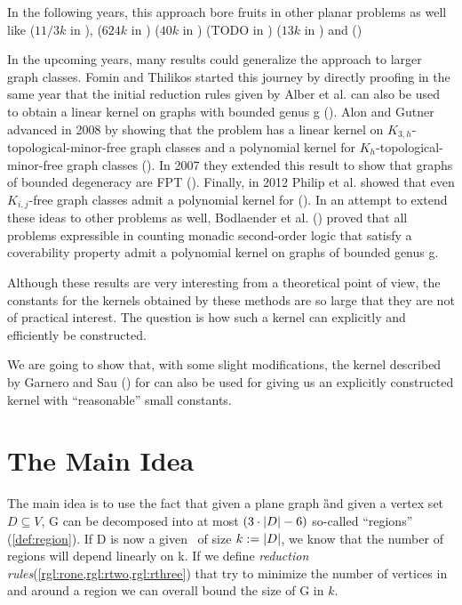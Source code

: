 In the following years, this approach bore fruits in other planar problems as well like 
\xspace ($11/3k$ in \cite{Kowalik2013}),
\xspace ($624k$ in \cite{Wang2011})
\xspace ($40k$ in \cite{Kanj2011})
\xspace (TODO in \cite{Guo2006})
\xspace ($13k$ in \cite{Bonamy2016}) and 
\xspace (\cite{Garnero2019})

In the upcoming years, many results could generalize the approach to larger graph classes. Fomin and Thilikos started this journey by directly proofing in the same year that the initial reduction rules given by Alber et al. \cite{Alber2004} can also be used to obtain a linear kernel on graphs with bounded genus g (\cite{Fomin2004}).  Alon and Gutner advanced in 2008 by showing that the problem has a linear kernel on $K_{3,h}$-topological-minor-free graph classes and a polynomial kernel for $K_h$-topological-minor-free graph classes (\cite{Gutner2009}). In 2007 they extended this result to show that graphs of bounded degeneracy are FPT (\cite{Alon2007}). Finally, in 2012 Philip et al. showed that even $K_{i,j}$-free graph classes admit a polynomial kernel for \dom (\cite{Philip2012}). 
In an attempt to extend these ideas to other problems as well, Bodlaender et al. (\cite{Bodlaender2016}) proved that all problems expressible in counting monadic second-order logic that satisfy a coverability property admit a polynomial kernel on graphs of bounded genus g.

Although these results are very interesting from a theoretical point of view, the constants for the kernels obtained by these methods are so large that they are not of practical interest. The question is how such a kernel can explicitly and efficiently be constructed. 

We are going to show that, with some slight modifications, the kernel described by Garnero and Sau (\cite{Garnero2014}) for \ptdom can also be used for \psdom giving us an explicitly constructed kernel with ``reasonable'' small constants.

\section{The Main Idea}

The main idea is to use the fact that given a plane graph \G and given a vertex set $D \subseteq V$, G can be decomposed into at most $(3 \cdot \abs{D} -6)$ so-called ``regions'' (\cref{def:region}). If D is now a given \sdom~of size $k := \abs{D}$, we know that the number of regions will depend linearly on k. If we define  \textit{reduction rules}(\cref{rgl:rone,rgl:rtwo,rgl:rthree}) that try to minimize the number of vertices in and around a region we can overall bound the size of G in $k$.

